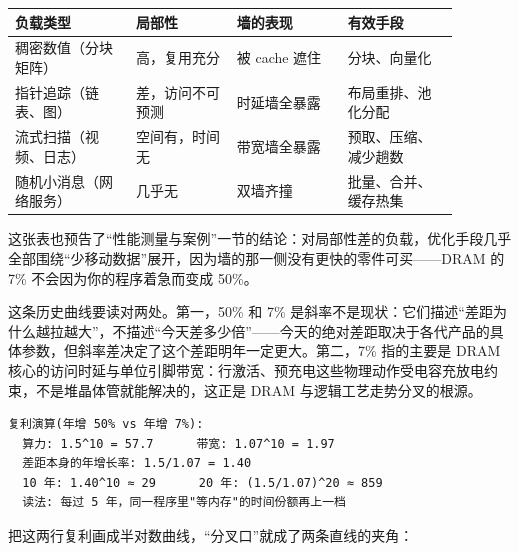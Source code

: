 \begin{longtable}{L{0.24\linewidth}L{0.20\linewidth}L{0.22\linewidth}L{0.22\linewidth}}
\toprule
负载类型 & 局部性 & 墙的表现 & 有效手段 \\
\midrule
稠密数值（分块矩阵） & 高，复用充分 & 被 cache 遮住 & 分块、向量化 \\\tablerowrule
指针追踪（链表、图） & 差，访问不可预测 & 时延墙全暴露 & 布局重排、池化分配 \\\tablerowrule
流式扫描（视频、日志） & 空间有，时间无 & 带宽墙全暴露 & 预取、压缩、减少趟数 \\\tablerowrule
随机小消息（网络服务） & 几乎无 & 双墙齐撞 & 批量、合并、缓存热集 \\
\bottomrule
\end{longtable}

这张表也预告了“性能测量与案例”一节的结论：对局部性差的负载，优化手段几乎全部围绕“少移动数据”展开，因为墙的那一侧没有更快的零件可买——DRAM 的 7\% 不会因为你的程序着急而变成 50\%。

这条历史曲线要读对两处。第一，50\% 和 7\% 是斜率不是现状：它们描述“差距为什么越拉越大”，不描述“今天差多少倍”——今天的绝对差距取决于各代产品的具体参数，但斜率差决定了这个差距明年一定更大。第二，7\% 指的主要是 DRAM 核心的访问时延与单位引脚带宽：行激活、预充电这些物理动作受电容充放电约束，不是堆晶体管就能解决的，这正是 DRAM 与逻辑工艺走势分叉的根源。

\begin{lstlisting}
复利演算(年增 50% vs 年增 7%):
  算力: 1.5^10 = 57.7      带宽: 1.07^10 = 1.97
  差距本身的年增长率: 1.5/1.07 = 1.40
  10 年: 1.40^10 ≈ 29      20 年: (1.5/1.07)^20 ≈ 859
  读法: 每过 5 年，同一程序里"等内存"的时间份额再上一档
\end{lstlisting}

把这两行复利画成半对数曲线，“分叉口”就成了两条直线的夹角：


